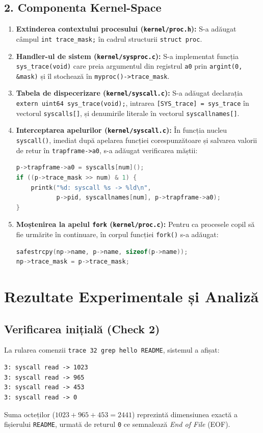 \documentclass[12pt,a4paper]{article}
\begin{document}
\subsection{2. Componenta Kernel-Space}
\begin{enumerate}
    \item \textbf{Extinderea contextului procesului (\texttt{kernel/proc.h}):}  
    S-a adăugat câmpul \texttt{int trace\_mask;} în cadrul structurii \texttt{struct proc}.
    \item \textbf{Handler-ul de sistem (\texttt{kernel/sysproc.c}):}  
    S-a implementat funcția \texttt{sys\_trace(void)} care preia argumentul din registrul \texttt{a0} prin \texttt{argint(0, \&mask)} și îl stochează în \texttt{myproc()->trace\_mask}.
    \item \textbf{Tabela de dispecerizare (\texttt{kernel/syscall.c}):}  
    S-a adăugat declarația \texttt{extern uint64 sys\_trace(void);}, intrarea \texttt{[SYS\_trace] = sys\_trace} în vectorul \texttt{syscalls[]}, și denumirile literale în vectorul \texttt{syscallnames[]}.
    \item \textbf{Interceptarea apelurilor (\texttt{kernel/syscall.c}):}  
    În funcția nucleu \texttt{syscall()}, imediat după apelarea funcției corespunzătoare și salvarea valorii de retur în \texttt{trapframe->a0}, s-a adăugat verificarea măștii:
    \begin{lstlisting}[language=C]
p->trapframe->a0 = syscalls[num]();
if ((p->trace_mask >> num) & 1) {
    printk("%d: syscall %s -> %ld\n",
           p->pid, syscallnames[num], p->trapframe->a0);
}
    \end{lstlisting}
    \item \textbf{Moștenirea la apelul \texttt{fork} (\texttt{kernel/proc.c}):}  
    Pentru ca procesele copil să fie urmărite în continuare, în corpul funcției \texttt{fork()} s-a adăugat:
    \begin{lstlisting}[language=C]
safestrcpy(np->name, p->name, sizeof(p->name));
np->trace_mask = p->trace_mask;
    \end{lstlisting}
\end{enumerate}

\section{Rezultate Experimentale și Analiză}

\subsection{Verificarea inițială (Check 2)}
La rularea comenzii \texttt{trace 32 grep hello README}, sistemul a afișat:
\begin{lstlisting}
3: syscall read -> 1023
3: syscall read -> 965
3: syscall read -> 453
3: syscall read -> 0
\end{lstlisting}
Suma octeților ($1023 + 965 + 453 = 2441$) reprezintă dimensiunea exactă a fișierului \texttt{README}, urmată de returul \texttt{0} ce semnalează \textit{End of File} (EOF).
\end{document}
